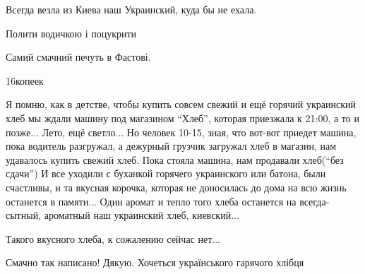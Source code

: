 \begin{itemize}
Всегда везла из Киева наш Украинский, куда бы не ехала.

Полити водичкою і поцукрити

Самий смачний печуть в Фастові.

16копеек

Я помню, как в детстве, чтобы купить совсем свежий и ещё горячий украинский
хлеб мы ждали машину под магазином \enquote{Хлеб}, которая приезжала к 21:00, а то и
позже... Лето, ещё светло... Но человек 10-15, зная, что вот-вот приедет
машина, пока водитель разгружал, а дежурный грузчик загружал хлеб в магазин, нам
удавалось купить свежий хлеб. Пока стояла машина, нам продавали хлеб(\enquote{без
сдачи}) И все уходили с буханкой горячего украинского или батона, были
счастливы, и та вкусная корочка, которая не доносилась до дома на всю жизнь
останется в памяти... Один аромат и тепло того хлеба останется на
всегда-сытный, ароматный наш украинский хлеб, киевский...

Такого вкусного хлеба, к сожалению сейчас нет...


Смачно так написано! Дякую. Хочеться українського гарячого хлібця


\end{itemize} %
